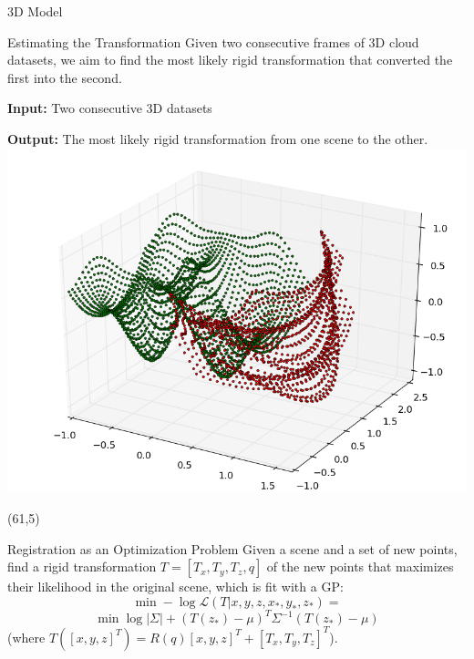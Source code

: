 \documentclass[final]{beamer}
\begin{document}
\begin{frame}{}
\begin{textblock}{27.5}
\begin{block}{3D Model}
\end{block}

\begin{block}{Estimating the Transformation}
Given two consecutive frames of 3D cloud datasets, we aim to find the most likely rigid transformation that converted the first into the second.

\textbf{Input:} Two consecutive 3D datasets

\textbf{Output:} The most likely rigid transformation from one scene to the other.
\includegraphics[width=10in]{3DWorldModel.png}
\end{block}

\end{textblock}

\begin{textblock}{27}(61,5)




\begin{block}{Registration as an Optimization Problem}
Given a scene and a set of new points, find a rigid transformation $T = [T_x,T_y,T_z,q]$ of the new points 
that maximizes their likelihood in the original scene, which is fit with a GP:
$$\min -\log\mathcal{L}(T|x,y,z,x_*,y_*,z_*) =$$
$$ \min \log|\Sigma| + (T(z_*) - \mu)^T \Sigma^{-1} (T(z_*) - \mu)$$
(where $T([x,y,z]^T) = R(q)[x,y,z]^T + [T_x,T_y,T_z]^T$).

\end{block}



\end{textblock}
\end{frame}
\end{document}
